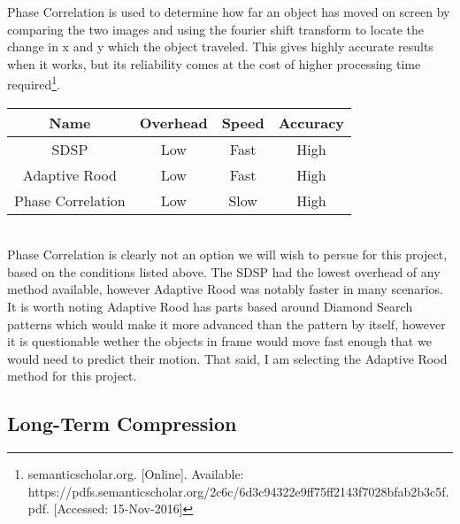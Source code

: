 \documentclass[letterpaper,10pt,onecolumn,draftclsnofoot]{IEEEtran}
\begin{document}
Phase Correlation is used to determine how far an object has moved on screen by comparing the two images and using the fourier shift transform to locate the change in x and y which the object traveled.  This gives highly accurate results when it works, but its reliability  comes at the cost of higher processing time required\footnote{semanticscholar.org. [Online]. Available: https://pdfs.semanticscholar.org/2c6c/6d3c94322e9ff75ff2143f7028bfab2b3c5f.pdf. [Accessed: 15-Nov-2016] }. \\

\begin{tabular}{|c|c|c|c|}
  \hline
  \textbf{Name} & \textbf{Overhead} & \textbf{Speed} & \textbf{Accuracy} \\
  \hline
  SDSP & Low & Fast & High \\ 
  \hline
  Adaptive Rood & Low & Fast & High  \\ 
  \hline
  Phase Correlation & Low & Slow & High \\ 
  \hline
\end{tabular} \\

Phase Correlation is clearly not an option we will wish to persue for this project, based on the conditions listed above.  The SDSP had the lowest overhead of any method available, however Adaptive Rood was notably faster in many scenarios.  It is worth noting Adaptive Rood has parts based around Diamond Search patterns which would make it more advanced than the pattern by itself, however it is questionable wether the objects in frame would move fast enough that we would need to predict their motion.  That said, I am selecting the Adaptive Rood method for this project.


\newpage
\subsection{Long-Term Compression} %
\end{document}
